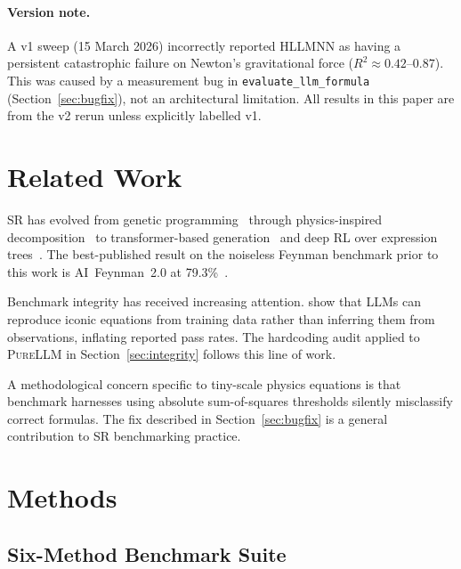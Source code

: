\documentclass[twoside,11pt]{article}
\newcommand{\PureLLM}{\textsc{PureLLM}}
\newcommand{\HSL}{\textsc{HLLMNN}}
\newcommand{\Rsq}{R^{2}}
\begin{document}
\paragraph{Version note.}
A v1 sweep (15 March 2026) incorrectly reported \HSL{} as having a persistent
catastrophic failure on Newton's gravitational force ($\Rsq \approx 0.42$--$0.87$).
This was caused by a measurement bug in \texttt{evaluate\_llm\_formula}
(Section~\ref{sec:bugfix}), not an architectural limitation.  All results in
this paper are from the v2 rerun unless explicitly labelled v1.

\section{Related Work}
\label{sec:related}

SR has evolved from genetic programming~\citep{schmidt2009} through
physics-inspired decomposition~\citep{udrescu2020ai} to transformer-based
generation~\citep{biggio2021neural,li2022transformer} and deep RL over
expression trees~\citep{petersen2021deep}.  The best-published result on the
noiseless Feynman benchmark prior to this work is AI~Feynman~2.0 at
79.3\%~\citep{udrescu2020ai}.

Benchmark integrity has received increasing attention.
\citet{MemorizationAudit2024} show that LLMs can reproduce iconic equations
from training data rather than inferring them from observations, inflating
reported pass rates.  The hardcoding audit applied to \PureLLM{} in
Section~\ref{sec:integrity} follows this line of work.

A methodological concern specific to tiny-scale physics equations is that
benchmark harnesses using absolute sum-of-squares thresholds silently
misclassify correct formulas.  The fix described in Section~\ref{sec:bugfix}
is a general contribution to SR benchmarking practice.

\section{Methods}
\label{sec:methods}

\subsection{Six-Method Benchmark Suite}
\label{sec:methods:sixmethod}
\end{document}
